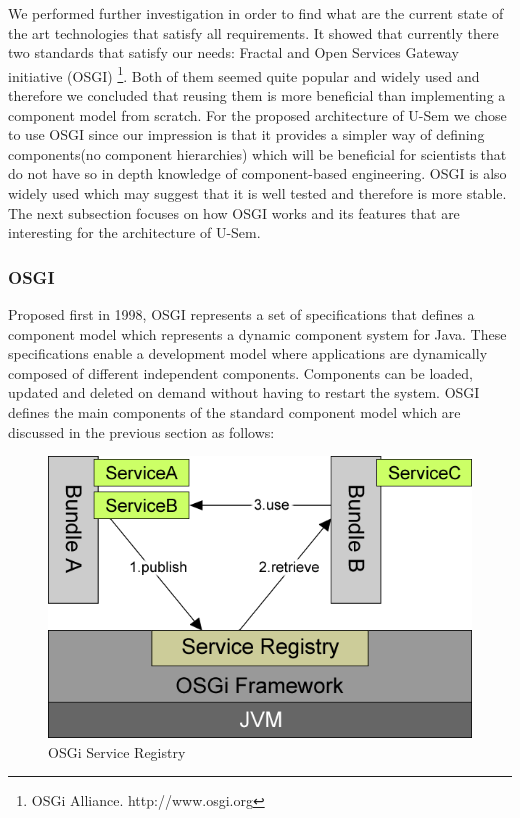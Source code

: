 We performed further investigation in order to find what are the current state of the art technologies that satisfy all requirements. It showed that currently there two standards that satisfy our needs: Fractal \cite{bruneton2006fractal} and Open Services Gateway initiative (OSGI) \footnote{OSGi Alliance. http://www.osgi.org}. Both of them seemed quite popular and widely used and therefore we concluded that reusing them is more beneficial than implementing a component model from scratch. For the proposed architecture of U-Sem we chose to use OSGI since our impression is that it provides a simpler way of defining components(no component hierarchies) which will be beneficial for scientists that do not have so in depth knowledge of component-based engineering. OSGI is also widely used \cite{tavares2008gentle} which may suggest that it is well tested and therefore is more stable. The next subsection focuses on how OSGI works and its features that are interesting for the architecture of U-Sem.


\subsubsection{OSGI}

Proposed first in 1998, OSGI represents a set of specifications that defines a component model which represents a dynamic component system for Java. These specifications enable a development model where applications are dynamically composed of different independent components. Components can be loaded, updated and deleted on demand without having to restart the system. OSGI defines the main components of the standard component model which are discussed in the previous section as follows:

\begin{figure}[h!]
  \centering
  	\includegraphics[scale=0.6]{plug-in/OSGI.png}
  \caption{OSGi Service Registry \cite{tavares2008gentle}}
  \label{fig_osgi}
\end{figure}

